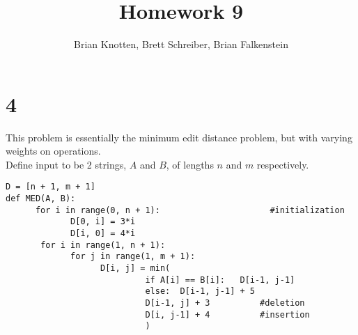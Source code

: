 \documentclass[letterpaper,notitlepage,twoside]{article}
\begin{document}
\title{Homework 9}
\author{Brian Knotten, Brett Schreiber, Brian Falkenstein}
\maketitle

\section*{4}
This problem is essentially the minimum edit distance problem, but with varying weights on operations. \\
Define input to be 2 strings, $A$ and $B$, of lengths $n$ and $m$ respectively.
\begin{verbatim}
D = [n + 1, m + 1]
def MED(A, B):
      for i in range(0, n + 1):                      #initialization 
             D[0, i] = 3*i
             D[i, 0] = 4*i
       for i in range(1, n + 1):
             for j in range(1, m + 1):
                   D[i, j] = min(
                            if A[i] == B[i]:   D[i-1, j-1]
                            else:  D[i-1, j-1] + 5
                            D[i-1, j] + 3          #deletion
                            D[i, j-1] + 4          #insertion
                            )
\end{verbatim}
\end{document}
